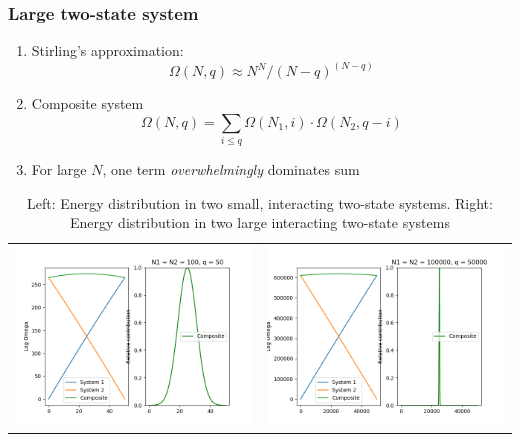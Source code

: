 \documentclass[11pt]{article}
\begin{document}
\subsubsection{Large two-state system}
\label{sec:orge0c1761}
\begin{enumerate}
\item Stirling's approximation:
\[\Omega(N,q) \approx N^N/(N-q)^{(N-q)}\]
\item Composite system
\[\Omega(N,q) = \sum_{i\le q} \Omega(N_1,i)\cdot \Omega(N_2,q-i) \]
\item For large \(N\), one term \emph{overwhelmingly} dominates sum
\end{enumerate}
\begin{table}
   \caption{Left: Energy distribution in two small, interacting two-state systems.  Right: Energy distribution in two large interacting two-state systems}
\begin{tabular}{cc}
\includegraphics[scale=0.5]{Images/2state-100.png} & \includegraphics[scale=0.5]{Images/2state-100000.png}
\end{tabular}
\end{table}
\end{document}
